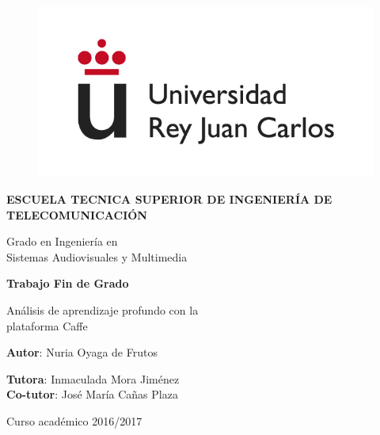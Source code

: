 \begin{titlepage}

\begin{center}

\begin{figure}[htb]
\begin{center}
	\includegraphics[width=0.6\linewidth]{figures/logo}
\end{center}
\end{figure}

\vspace{10mm}

\begin{Large}
\textbf{ESCUELA TECNICA SUPERIOR DE INGENIERÍA DE TELECOMUNICACIÓN}
\vspace{10mm}
\end{Large}

\begin{Large}
Grado en Ingeniería en\\ \vspace{2mm} Sistemas Audiovisuales y Multimedia
\end{Large}

\vspace{10mm}

\begin{large}
\textbf{Trabajo Fin de Grado}
\end{large}
\vspace{15mm}

\begin{huge}
Análisis de aprendizaje profundo con la \\
\vspace{5mm}
plataforma Caffe
\end{huge}

\vspace{20mm}

\begin{large}
\textbf{Autor}: Nuria Oyaga de Frutos

\textbf{Tutora}: Inmaculada Mora Jiménez \\
\textbf{Co-tutor}: José María Cañas Plaza

\vspace{10mm}

Curso académico 2016/2017
\end{large}

\vspace{10mm}

\end{center}

\end{titlepage}

